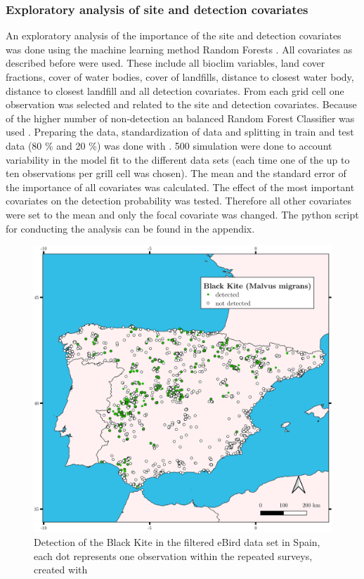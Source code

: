 \begin{multicols}{2}
\subsubsection*{Exploratory analysis of site and detection covariates}
An exploratory analysis of the importance of the site and detection covariates was done using the machine learning method Random Forests \parencite{Ho1995}. All covariates as described before were used. These include all bioclim variables, land cover fractions, cover of water bodies, cover of landfills, distance to closest water body, distance to closest landfill and all detection covariates. From each grid cell one observation was selected and related to the site and detection covariates. Because of the higher number of non-detection an balanced Random Forest Classifier was used \parencite[with default parameters]{Imbalanced-learn}. Preparing the data, standardization of data and splitting in train and test data (80 \% and 20 \%) was done with \textcite{sklearn, numpy, pandas}. 500 simulation were done to account variability in the model fit to the different data sets (each time one of the up to ten observations per grill cell was chosen). The mean and the standard error of the importance of all covariates was calculated. The effect of the most important covariates on the detection probability was tested. Therefore all other covariates were set to the mean and only the focal covariate was changed. The python script for conducting the analysis can be found in the appendix. 


\begin{figure}[t]
	\centering
	\includegraphics[width=0.6\linewidth]{img/occurences}
	\caption{Detection of the Black Kite in the filtered eBird data set in Spain, each dot represents one observation within the repeated surveys, created with \textcite{QGIS_software}}
	\label{fig:occurences}
\end{figure}



\end{multicols}
